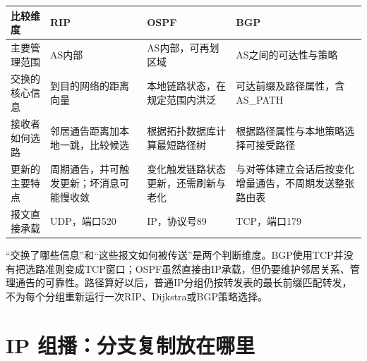 \begin{wideblock}

\par\medskip\noindent\begin{minipage}{\linewidth}\fontsize{9.3}{12}\selectfont\begin{tabularx}{\linewidth}{@{}YYYY@{}}
\toprule\noalign{}
\begin{minipage}[b]{\linewidth}\raggedright
比较维度
\end{minipage} & \begin{minipage}[b]{\linewidth}\raggedright
RIP
\end{minipage} & \begin{minipage}[b]{\linewidth}\raggedright
OSPF
\end{minipage} & \begin{minipage}[b]{\linewidth}\raggedright
BGP
\end{minipage} \\
\midrule\noalign{}


主要管理范围 & AS内部 & AS内部，可再划区域 & AS之间的可达性与策略 \\
交换的核心信息 & 到目的网络的距离向量 & 本地链路状态，在规定范围内洪泛 & 可达前缀及路径属性，含AS\_PATH \\
接收者如何选路 & 邻居通告距离加本地一跳，比较候选 & 根据拓扑数据库计算最短路径树 & 根据路径属性与本地策略选择可接受路径 \\
更新的主要特点 & 周期通告，并可触发更新；坏消息可能慢收敛 & 变化触发链路状态更新，还需刷新与老化 & 与对等体建立会话后按变化增量通告，不周期发送整张路由表 \\
报文直接承载 & UDP，端口520 & IP，协议号89 & TCP，端口179 \\
\bottomrule\end{tabularx}
\end{minipage}\par\medskip

\end{wideblock}

``交换了哪些信息''和``这些报文如何被传送''是两个判断维度。BGP使用TCP并没有把选路准则变成TCP窗口；OSPF虽然直接由IP承载，但仍要维护邻居关系、管理通告的可靠性。路径算好以后，普通IP分组仍按转发表的最长前缀匹配转发，不为每个分组重新运行一次RIP、Dijkstra或BGP策略选择。

\section{IP 组播：分支复制放在哪里}\label{CN04-19}

